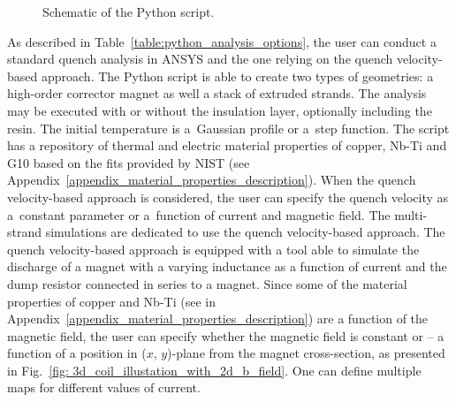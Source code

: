 \begin{figure}[H]
    \caption{Schematic of the Python script.}
    \label{fig:block_diagram_python_architecture}
\end{figure}

As described in Table~\ref{table:python_analysis_options}, the user can conduct a standard quench analysis in ANSYS and the one relying on the quench velocity-based approach. The Python script is able to create two types of geometries: a high-order corrector magnet as well a stack of extruded strands. The analysis may be executed with or without the insulation layer, optionally including the resin. The initial temperature is a~Gaussian profile or a~step function. The script has a repository of thermal and electric material properties of copper, Nb-Ti and G10 based on the fits provided by NIST (see Appendix~\ref{appendix_material_properties_description}). When the quench velocity-based approach is considered, the user can specify the quench velocity as a~constant parameter or a~function of current and magnetic field. The multi-strand simulations are dedicated to use the quench velocity-based approach. The quench velocity-based approach is equipped with a tool able to simulate the discharge of a magnet with a varying inductance as a function of current and the dump resistor connected in series to a magnet. Since some of the material properties of copper and Nb-Ti (see in Appendix~\ref{appendix_material_properties_description}) are a function of the magnetic field, the user can specify whether the magnetic field is constant or -- a function of a position in ($x$, $y$)-plane from the magnet cross-section, as presented in Fig.~\ref{fig: 3d_coil_illustation_with_2d_b_field}. One can define multiple maps for different values of current.

